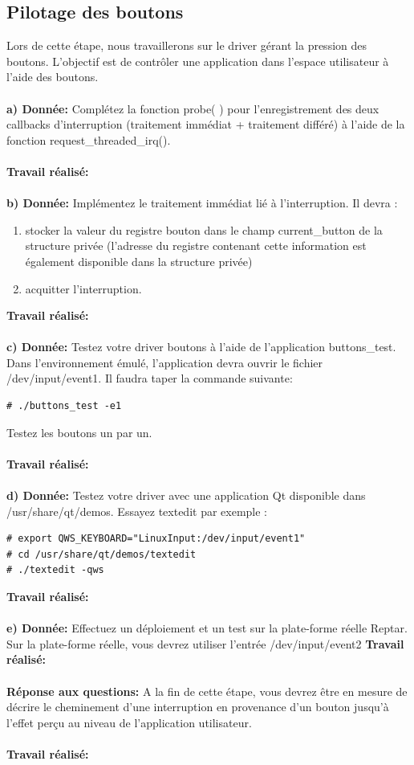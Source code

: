 \subsection{Pilotage des boutons}
Lors de cette étape, nous travaillerons sur le driver gérant la pression des boutons. L'objectif est de
contrôler une application dans l'espace utilisateur à l'aide des boutons.\\\\
\textbf{a) Donnée: }Complétez la fonction probe( ) pour l'enregistrement des deux callbacks d'interruption (traitement
immédiat + traitement différé) à l'aide de la fonction request\_threaded\_irq().\\\\
\textbf{Travail réalisé: }\\\\
\textbf{b) Donnée: }Implémentez le traitement immédiat lié à l'interruption. Il devra :
\begin{enumerate}
	\item stocker la valeur du registre bouton dans le champ current\_button de la structure privée
	(l'adresse du registre contenant cette information est également disponible dans la structure
	privée)
	\item acquitter l'interruption.\\
\end{enumerate}
\textbf{Travail réalisé: }\\\\
\textbf{c) Donnée: }Testez votre driver boutons à l'aide de l'application buttons\_test. Dans l'environnement émulé,
l'application devra ouvrir le fichier /dev/input/event1. Il faudra taper la commande suivante:
\begin{lstlisting}
# ./buttons_test -e1
\end{lstlisting}
Testez les boutons un par un.\\\\
\textbf{Travail réalisé: }\\\\
\textbf{d) Donnée: }Testez votre driver avec une application Qt disponible dans /usr/share/qt/demos. Essayez textedit
par exemple : 
\begin{lstlisting}
# export QWS_KEYBOARD="LinuxInput:/dev/input/event1"
# cd /usr/share/qt/demos/textedit
# ./textedit -qws 
\end{lstlisting}
\textbf{Travail réalisé: }\\\\
\textbf{e) Donnée: }Effectuez un déploiement et un test sur la plate-forme réelle Reptar. Sur la plate-forme réelle, vous
devrez utiliser l'entrée /dev/input/event2
\textbf{Travail réalisé: }\\\\
\textbf{Réponse aux questions: }A la fin de cette étape, vous devrez être en mesure de décrire le cheminement d'une interruption
en provenance d'un bouton jusqu'à l'effet perçu au niveau de l’application utilisateur. \\\\
\textbf{Travail réalisé: }\\\\